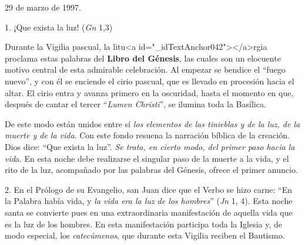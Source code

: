 			\begin{referencia}29 de marzo de 1997.\end{referencia}
			
			\begin{body}1. ¡Que exista la luz! (\textit{Gn} 1,3)\end{body}
			
			\begin{body}Durante la Vigilia pascual, la litu<a id="_idTextAnchor042"></a>rgia proclama estas palabras del \textbf{Libro del Génesis}, las cuales son un elocuente motivo central de esta admirable celebración. Al empezar se bendice el “fuego nuevo”, y con él se enciende el cirio pascual, que es llevado en procesión hacia el altar. El cirio entra y avanza primero en la oscuridad, hasta el momento en que, después de cantar el tercer “\textit{Lumen Christi}”, se ilumina toda la Basílica.\end{body}
			
			\begin{body}De este modo están unidos entre sí \textit{los elementos de las tinieblas y de la luz, de la muerte y de la vida}. Con este fondo resuena la narración bíblica de la creación. Dios dice: “Que exista la luz”. \textit{Se trata, en cierto modo, del primer paso hacia la vid}a. En esta noche debe realizarse el singular paso de la muerte a la vida, y el rito de la luz, acompañado por las palabras del Génesis, ofrece el primer anuncio.\end{body}
			
			\begin{body}2. En el Prólogo de su Evangelio, san Juan dice que el Verbo se hizo carne: “En la Palabra había vida, y\textit{ la vida era la luz de los hombres}” (\textit{Jn} 1, 4). Esta noche santa se convierte pues en una extraordinaria manifestación de aquella vida que es la luz de los hombres. En esta manifestación participa toda la Iglesia y, de modo especial, los \textit{catecúmenos}, que durante esta Vigilia reciben el Bautismo.\end{body}
			
			\begin{body}\begin{bodysmall}\end{bodysmall}\end{body}
			
